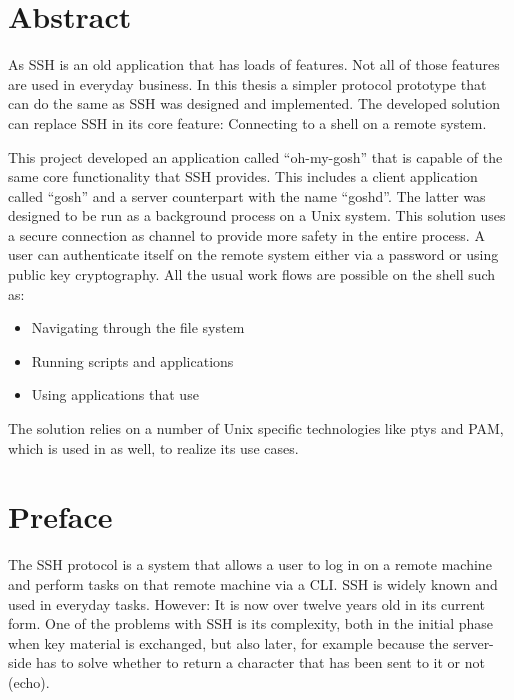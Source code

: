 \documentclass[10pt,a4paper,titlepage,twoside,english,final]{zhawreprt}
\begin{document}
\maketitle

\chapter*{Abstract}\label{sec:Abstract}
As \gls{SSH} is an old application that has loads of features.
Not all of those features are used in everyday business.
In this thesis a simpler protocol prototype that can do the same as \gls{SSH} was designed and implemented.
The developed solution can replace \gls{SSH} in its core feature:
Connecting to a \gls{shell} on a remote system.

This project developed an application called ``oh-my-gosh'' that is capable of the same core functionality that \gls{SSH} provides. This includes a client application called ``gosh'' and a server counterpart with the name ``goshd''.
The latter was designed to be run as a background process on a \gls{Unix} system.
This solution uses a secure connection as channel to provide more safety in the entire process.
A user can authenticate itself on the remote system either via a password or using public key cryptography.
All the usual work flows are possible on the \gls{shell} such as:

\begin{itemize}
\item Navigating through the file system
\item Running scripts and applications
\item Using applications that use \cite{ncurses}
\end{itemize}

The solution relies on a number of \gls{Unix} specific technologies like \glspl{pty} and \gls{PAM}, which is used in \cite{login} as well, to realize its use cases.



\chapter*{Preface}\label{sec:Preface}
The \gls{SSH} protocol \citep{rfc253,rfc6668,rfc8268,rfc8308,rfc8332} is a system that allows a user to log in on a remote machine and perform tasks on that remote machine via a \gls{CLI}.
\gls{SSH} is widely known and used in everyday tasks.
However: It is now over twelve years old in its current form.
One of the problems with \gls{SSH} is its complexity, both in the initial phase when key material is exchanged, but also later, for example because the server-side has to solve whether to return a character that has been sent to it or not (echo).
\end{document}
